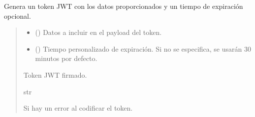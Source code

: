 \documentclass[letterpaper,10pt,spanish]{sphinxmanual}
\begin{document}
\begin{fulllineitems}
\label{\detokenize{modelos:main.crear_token}}
\pysigstartsignatures
\pysiglinewithargsret
{}
{\sphinxparamcomma {}}
{}
\pysigstopsignatures
\sphinxAtStartPar
Genera un token JWT con los datos proporcionados y un tiempo de expiración opcional.
\begin{quote}\begin{description}
\begin{itemize}
\item {} 
\sphinxAtStartPar
{} () \textendash{} Datos a incluir en el payload del token.

\item {} 
\sphinxAtStartPar
{} (\sphinxstyleliteralemphasis{\sphinxupquote{{[}}}\sphinxstyleliteralemphasis{\sphinxupquote{{]}}}) \textendash{} Tiempo personalizado de expiración. Si no se especifica, se usarán 30 minutos por defecto.

\end{itemize}

\sphinxAtStartPar
Token JWT firmado.

\sphinxAtStartPar
str

\sphinxAtStartPar
{} \textendash{} Si hay un error al codificar el token.

\end{description}\end{quote}

\end{fulllineitems}

\end{document}
